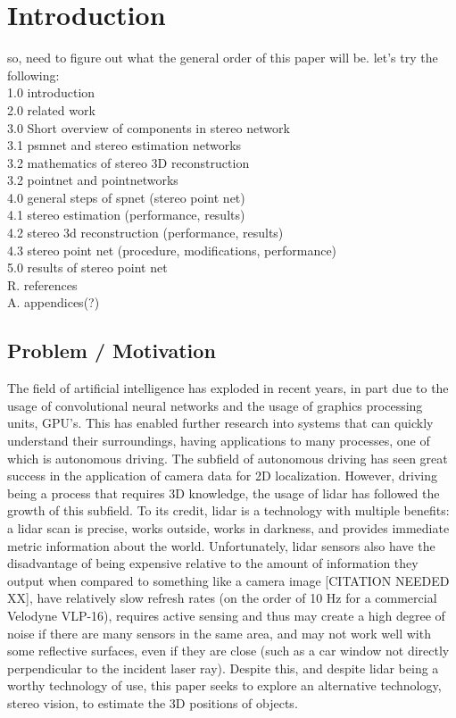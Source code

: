 \section{Introduction}
so, need to figure out what the general order of this paper will be. let's try the following: \\
1.0 introduction \\
2.0 related work \\
3.0 Short overview of components in stereo network \\
  3.1 psmnet and stereo estimation networks \\
  3.2 mathematics of stereo 3D reconstruction \\
  3.2 pointnet and pointnetworks \\
4.0 general steps of spnet (stereo point net) \\
  4.1 stereo estimation (performance, results) \\
  4.2 stereo 3d reconstruction (performance, results) \\
  4.3 stereo point net (procedure, modifications, performance) \\
5.0 results of stereo point net \\
R. references \\
A. appendices(?) \\

\subsection{Problem / Motivation}
The field of artificial intelligence has exploded in recent years, in part due to the usage of convolutional neural networks and the usage of graphics processing units, GPU's. This has enabled further research into systems that can quickly understand their surroundings, having applications to many processes, one of which is autonomous driving. The subfield of autonomous driving has seen great success in the application of camera data for 2D localization. However, driving being a process that requires 3D knowledge, the usage of lidar has followed the growth of this subfield. To its credit, lidar is a technology with multiple benefits: a lidar scan is precise, works outside, works in darkness, and provides immediate metric information about the world. Unfortunately, lidar sensors also have the disadvantage of being expensive relative to the amount of information they output when compared to something like a camera image [CITATION NEEDED XX], have relatively slow refresh rates (on the order of 10 Hz for a commercial Velodyne VLP-16), requires active sensing and thus may create a high degree of noise if there are many sensors in the same area, and may not work well with some reflective surfaces, even if they are close (such as a car window not directly perpendicular to the incident laser ray). Despite this, and despite lidar being a worthy technology of use, this paper seeks to explore an alternative technology, stereo vision, to estimate the 3D positions of objects. 

